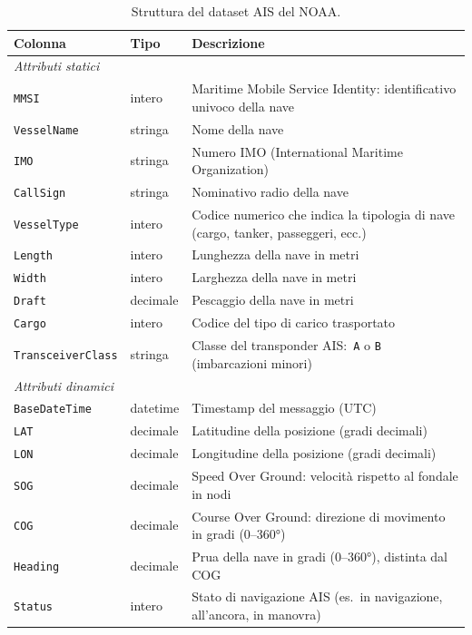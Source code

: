 \begin{table}[htbp]
\centering
\caption{Struttura del dataset AIS del NOAA.}\label{tab:dataset_columns}
\begin{tabular}{llp{7cm}}
\toprule
\textbf{Colonna} & \textbf{Tipo} & \textbf{Descrizione} \\
\midrule
\multicolumn{3}{l}{\textit{Attributi statici}} \\
\texttt{MMSI}          & intero   & Maritime Mobile Service Identity: identificativo univoco della nave \\
\texttt{VesselName}    & stringa  & Nome della nave \\
\texttt{IMO}           & stringa  & Numero IMO (International Maritime Organization) \\
\texttt{CallSign}      & stringa  & Nominativo radio della nave \\
\texttt{VesselType}    & intero   & Codice numerico che indica la tipologia di nave (cargo, tanker, passeggeri, ecc.) \\
\texttt{Length}        & intero   & Lunghezza della nave in metri \\
\texttt{Width}         & intero   & Larghezza della nave in metri \\
\texttt{Draft}         & decimale & Pescaggio della nave in metri \\
\texttt{Cargo}         & intero   & Codice del tipo di carico trasportato \\
\texttt{TransceiverClass} & stringa & Classe del transponder AIS:\ \texttt{A} o \texttt{B} (imbarcazioni minori) \\
\midrule
\multicolumn{3}{l}{\textit{Attributi dinamici}} \\
\texttt{BaseDateTime}  & datetime & Timestamp del messaggio (UTC) \\
\texttt{LAT}           & decimale & Latitudine della posizione (gradi decimali) \\
\texttt{LON}           & decimale & Longitudine della posizione (gradi decimali) \\
\texttt{SOG}           & decimale & Speed Over Ground: velocità rispetto al fondale in nodi \\
\texttt{COG}           & decimale & Course Over Ground: direzione di movimento in gradi (0--360°) \\
\texttt{Heading}       & decimale & Prua della nave in gradi (0--360°), distinta dal COG \\
\texttt{Status}        & intero   & Stato di navigazione AIS (es.\ in navigazione, all'ancora, in manovra) \\
\bottomrule
\end{tabular}
\end{table}

